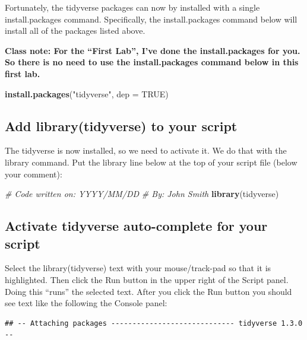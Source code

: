 \documentclass[
]{krantz}
\makeatletter
\newenvironment{Shaded}{\begin{snugshade}}{\end{snugshade}}
\newcommand{\CommentTok}[1]{\textcolor[rgb]{0.37,0.37,0.37}{\textit{#1}}}
\newcommand{\DataTypeTok}[1]{\textcolor[rgb]{0.27,0.27,0.27}{#1}}
\newcommand{\KeywordTok}[1]{\textcolor[rgb]{0.27,0.27,0.27}{\textbf{#1}}}
\newcommand{\NormalTok}[1]{#1}
\newcommand{\OtherTok}[1]{\textcolor[rgb]{0.37,0.37,0.37}{#1}}
\newcommand{\StringTok}[1]{\textcolor[rgb]{0.5,0.5,0.5}{#1}}
\newenvironment{kframe}{%
\medskip{}
\setlength{\fboxsep}{.8em}
 \def\at@end@of@kframe{}%
 \ifinner\ifhmode%
  \def\at@end@of@kframe{\end{minipage}}%
  \begin{minipage}{\columnwidth}%
 \fi\fi%
 \def\FrameCommand##1{\hskip\@totalleftmargin \hskip-\fboxsep
 \colorbox{shadecolor}{##1}\hskip-\fboxsep
     \hskip-\linewidth \hskip-\@totalleftmargin \hskip\columnwidth}%
 \MakeFramed {\advance\hsize-\width
   \@totalleftmargin\z@ \linewidth\hsize
   \@setminipage}}%
 {\par\unskip\endMakeFramed%
 \at@end@of@kframe}
\renewenvironment{Shaded}{\begin{kframe}}{\end{kframe}}
\makeatother
\begin{document}
Fortunately, the tidyverse packages can now by installed with a single install.packages command. Specifically, the install.packages command below will install all of the packages listed above.

\textbf{Class note: For the ``First Lab'', I've done the install.packages for you. So there is no need to use the install.packages command below in this first lab.}

\begin{Shaded}
\begin{Highlighting}[]
\KeywordTok{install.packages}\NormalTok{(}\StringTok{"tidyverse"}\NormalTok{, }\DataTypeTok{dep =} \OtherTok{TRUE}\NormalTok{)}
\end{Highlighting}
\end{Shaded}

\hypertarget{add-librarytidyverse-to-your-script}{%
\subsection{Add library(tidyverse) to your script}\label{add-librarytidyverse-to-your-script}}

The tidyverse is now installed, so we need to activate it. We do that with the library command. Put the library line below at the top of your script file (below your comment):

\begin{Shaded}
\begin{Highlighting}[]
\CommentTok{# Code written on: YYYY/MM/DD }
\CommentTok{# By: John Smith}
\KeywordTok{library}\NormalTok{(tidyverse)}
\end{Highlighting}
\end{Shaded}

\hypertarget{activate-tidyverse-auto-complete-for-your-script}{%
\subsection{Activate tidyverse auto-complete for your script}\label{activate-tidyverse-auto-complete-for-your-script}}

Select the library(tidyverse) text with your mouse/track-pad so that it is highlighted. Then click the Run button in the upper right of the Script panel. Doing this ``runs'' the selected text. After you click the Run button you should see text like the following the Console panel:

\begin{verbatim}
## -- Attaching packages ----------------------------- tidyverse 1.3.0 --
\end{verbatim}
\end{document}
